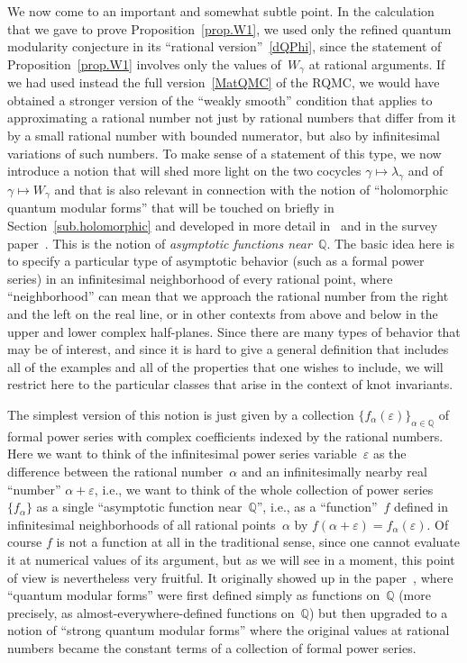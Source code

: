 \documentclass[pdftex]{sigma}
\numberwithin{equation}{section}
\def\l{\lambda}
\def\a{\alpha}
\def\l{\lambda}
\def\Q{\mathbb Q}
\def\a{\alpha}
\def\l{\lambda}
\def\ve{\varepsilon}
\def\g{\gamma}
\begin{document}
We now come to an important and somewhat subtle point. In the calculation that we gave
to prove Proposition~\ref{prop.W1}, we used only the refined quantum modularity
conjecture in its ``rational version''~\eqref{dQPhi}, since the statement of
Proposition~\ref{prop.W1} involves only the values of~$W_\g$ at rational arguments.
If we had used instead the full version~\eqref{MatQMC} of the RQMC, we would have
obtained a stronger version of the ``weakly smooth'' condition that applies to
approximating a rational number not just by rational numbers that differ from it by
a small rational number with bounded numerator, but also by infinitesimal variations
of such numbers. To make sense of a statement of this type, we now introduce a notion
that will shed more light on the two cocycles $\g\mapsto \l_\g$ and of~$\g\mapsto W_\g$
and that is also relevant in connection with the notion of ``holomorphic quantum
modular forms'' that will be touched on briefly in Section~\ref{sub.holomorphic} and
developed in more detail in~\cite{GZ:qseries} and in the survey paper~\cite{Z:HQMF}.
This is the notion of \emph{asymptotic functions near~$\Q$}. The basic idea here is to
specify a particular type of asymptotic behavior (such as a formal power series)
in an infinitesimal neighborhood of every rational point, where ``neighborhood'' can mean
that we approach the rational number from the right and the left on the real line,
or in other contexts from above and below in the upper and lower complex half-planes.
Since there are many types of behavior that may be of interest, and since it is hard
 to give a general definition that includes all of the examples and all of the properties
that one wishes to include, we will restrict here to the particular classes that arise
in the context of knot invariants.

The simplest version of this notion is just given by a collection
$\{f_\a(\ve)\}_{\a\in\Q}$ of formal power series with complex coefficients indexed by
the rational numbers. Here we want to think of the infinitesimal power series
variable~$\ve$ as the difference between the rational number~$\a$ and an
infinitesimally nearby real ``number'' $\a+\ve$, i.e., we want to think of the whole
collection of power series $\{f_\a\}$ as a single ``asymptotic function near~$\Q$'',
i.e., as a ``function''~$f$ defined in infinitesimal neighborhoods of all rational
points~$\a$ by $f(\a+\ve)=f_\a(\ve)$. Of course $f$ is not a function at all in the
traditional sense, since one cannot evaluate it at numerical values of its argument,
but as we will see in a moment, this point of view is nevertheless very fruitful. It
originally showed up in the paper~\cite{Za:QMF}, where ``quantum modular forms'' were
first defined simply as functions on~$\Q$ (more precisely, as almost-everywhere-defined
functions on~$\Q$) but then upgraded to a notion of ``strong quantum modular forms''
where the original values at rational numbers became the constant terms of a
collection of formal power series.
\end{document}
